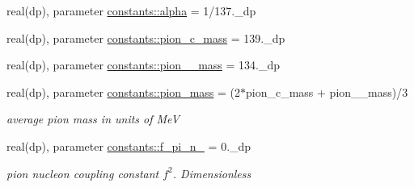 \begin{DoxyCompactItemize}
\item 
real(dp), parameter \hyperlink{namespaceconstants_ac62430db29fa548a130f2ba913b407f3}{constants\+::alpha} = 1/137.\+\_\+dp
\item 
real(dp), parameter \hyperlink{namespaceconstants_a336fcf9a7d6a3f7ccfb4cb3b4757510e}{constants\+::pion\+\_\+c\+\_\+mass} = 139.\+\_\+dp
\item 
real(dp), parameter \hyperlink{namespaceconstants_a27737907e81ada5ba3cff169aaad6377}{constants\+::pion\+\_\+\_\+mass} = 134.\+\_\+dp
\item 
real(dp), parameter \hyperlink{namespaceconstants_afc100a7b1657caff60d09094b943d318}{constants\+::pion\+\_\+mass} = (2$\ast$pion\+\_\+c\+\_\+mass + pion\+\_\+\_\+mass)/3
\begin{DoxyCompactList}\small\item\em average pion mass in units of MeV \end{DoxyCompactList}\item 
real(dp), parameter \hyperlink{namespaceconstants_a8aa189c0adcde5db078bbd208dd59c0c}{constants\+::f\+\_\+pi\+\_\+n\+\_} = 0.\+\_\+dp
\begin{DoxyCompactList}\small\item\em pion nucleon coupling constant $ f^2 $. Dimensionless \end{DoxyCompactList}\end{DoxyCompactItemize}
